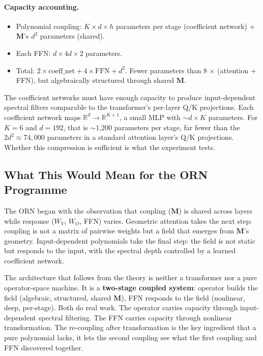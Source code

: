 \documentclass[11pt, a4paper]{article}
\newcommand{\M}{\mathbf{M}}
\newcommand{\R}{\mathbb{R}}
\theoremstyle{plain}
\theoremstyle{definition}
\theoremstyle{remark}
\begin{document}
\paragraph{Capacity accounting.}
\begin{itemize}[nosep]
\item Polynomial coupling: $K \times d \times h$ parameters per stage (coefficient network) + $\M$'s $d^2$ parameters (shared).
\item Each FFN: $d \times 4d \times 2$ parameters.
\item Total: $2 \times \text{coeff\_net} + 4 \times \text{FFN} + d^2$. Fewer parameters than 8 $\times$ (attention + FFN), but algebraically structured through shared $\M$.
\end{itemize}

The coefficient networks must have enough capacity to produce input-dependent spectral filters comparable to the transformer's per-layer Q/K projections.
Each coefficient network maps $\R^d \to \R^{K+1}$, a small MLP with $\sim d \times K$ parameters.
For $K = 6$ and $d = 192$, that is $\sim$1,200 parameters per stage, far fewer than the $2d^2 \approx 74,000$ parameters in a standard attention layer's Q/K projections.
Whether this compression is sufficient is what the experiment tests.

\subsection{What This Would Mean for the ORN Programme}

The ORN began with the observation that coupling ($\M$) is shared across layers while response ($W_V$, $W_O$, FFN) varies.
Geometric attention takes the next step: coupling is not a matrix of pairwise weights but a field that emerges from $\M$'s geometry.
Input-dependent polynomials take the final step: the field is not static but responds to the input, with the spectral depth controlled by a learned coefficient network.

The architecture that follows from the theory is neither a transformer nor a pure operator-space machine.
It is a \textbf{two-stage coupled system}: operator builds the field (algebraic, structured, shared $\M$), FFN responds to the field (nonlinear, deep, per-stage).
Both do real work.
The operator carries capacity through input-dependent spectral filtering.
The FFN carries capacity through nonlinear transformation.
The re-coupling after transformation is the key ingredient that a pure polynomial lacks, it lets the second coupling see what the first coupling and FFN discovered together.
\end{document}
